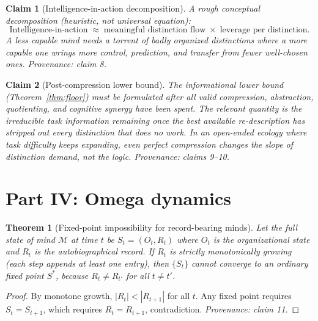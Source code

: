\documentclass[11pt]{article}
\newtheorem{claim}{Claim}
\newtheorem{theorem}{Theorem}
\begin{document}
\begin{claim}[Intelligence-in-action decomposition]
\label{claim:decomp}
A rough conceptual decomposition (heuristic, not universal equation):
\[
  \text{Intelligence-in-action} \;\approx\; \text{meaningful distinction flow} \;\times\; \text{leverage per distinction}.
\]
A less capable mind needs a torrent of badly organized distinctions where a more capable one wrings more control, prediction, and transfer from fewer well-chosen ones.
\emph{Provenance: claim 8.}
\end{claim}

\begin{claim}[Post-compression lower bound]
\label{claim:postcompress}
The informational lower bound (Theorem~\ref{thm:floor}) must be formulated after all valid compression, abstraction, quotienting, and cognitive synergy have been spent. The relevant quantity is the irreducible task information remaining once the best available re-description has stripped out every distinction that does no work. In an open-ended ecology where task difficulty keeps expanding, even perfect compression changes the slope of distinction demand, not the logic.
\emph{Provenance: claims 9--10.}
\end{claim}

\section{Part IV: Omega dynamics}

\begin{theorem}[Fixed-point impossibility for record-bearing minds]
\label{thm:fixedpoint}
Let the full state of mind $\mathcal{M}$ at time $t$ be $S_t = (O_t, R_t)$ where $O_t$ is the organizational state and $R_t$ is the autobiographical record. If $R_t$ is strictly monotonically growing (each step appends at least one entry), then $\{S_t\}$ cannot converge to an ordinary fixed point $S^*$, because $R_t \neq R_{t'}$ for all $t \neq t'$.
\end{theorem}
\begin{proof}
By monotone growth, $|R_t| < |R_{t+1}|$ for all $t$. Any fixed point requires $S_t = S_{t+1}$, which requires $R_t = R_{t+1}$, contradiction.
\emph{Provenance: claim 11.}
\end{proof}
\end{document}
